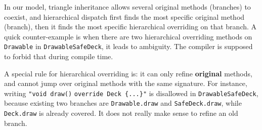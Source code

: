 In our model, triangle inheritance allows several original methods (branches) to coexist, and hierarchical dispatch first finds the most specific original method (branch), then it finds the most specific hierarchical overriding on that branch. A quick counter-example is when there are two hierarchical overriding methods on \lstinline|Drawable| in \lstinline|DrawableSafeDeck|, it leads to ambiguity. The compiler is supposed to forbid that during compile time.

A special rule for hierarchical overriding is: it can only refine \textbf{original} methods, and cannot jump over original methods with the same signature. For instance, writing \lstinline|"void draw()| \lstinline|override Deck {...}"| is disallowed in \lstinline|DrawableSafeDeck|, because existing two branches are \lstinline|Drawable.draw| and \lstinline|SafeDeck.draw|, while \lstinline|Deck.draw| is already covered. It does not really make sense to refine an old branch.

